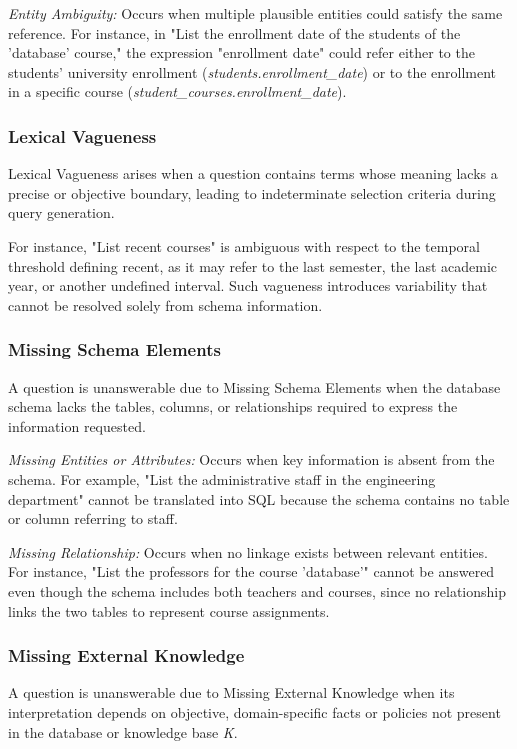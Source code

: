 \textit{Entity Ambiguity:} Occurs when multiple plausible entities could satisfy the same reference. For instance, in "List the enrollment date of the students of the 'database' course," the expression "enrollment date" could refer either to the students' university enrollment (\textit{students.enrollment\_date}) or to the enrollment in a specific course (\textit{student\_courses.enrollment\_date}). 

\subsubsection{Lexical Vagueness}
Lexical Vagueness arises when a question contains terms whose meaning lacks a precise or objective boundary, leading to indeterminate selection criteria during query generation.

For instance, "List recent courses" is ambiguous with respect to the temporal threshold defining recent, as it may refer to the last semester, the last academic year, or another undefined interval. Such vagueness introduces variability that cannot be resolved solely from schema information.

\subsubsection{Missing Schema Elements}
A question is unanswerable due to Missing Schema Elements when the database schema lacks the tables, columns, or relationships required to express the information requested.

\textit{Missing Entities or Attributes:} Occurs when key information is absent from the schema. For example, "List the administrative staff in the engineering department" cannot be translated into SQL because the schema contains no table or column referring to staff.

\textit{Missing Relationship:} Occurs when no linkage exists between relevant entities. For instance, "List the professors for the course 'database'" cannot be answered even though the schema includes both teachers and courses, since no relationship links the two tables to represent course assignments.

\subsubsection{Missing External Knowledge}
A question is unanswerable due to Missing External Knowledge when its interpretation depends on objective, domain-specific facts or policies not present in the database or knowledge base \textit{K}.

